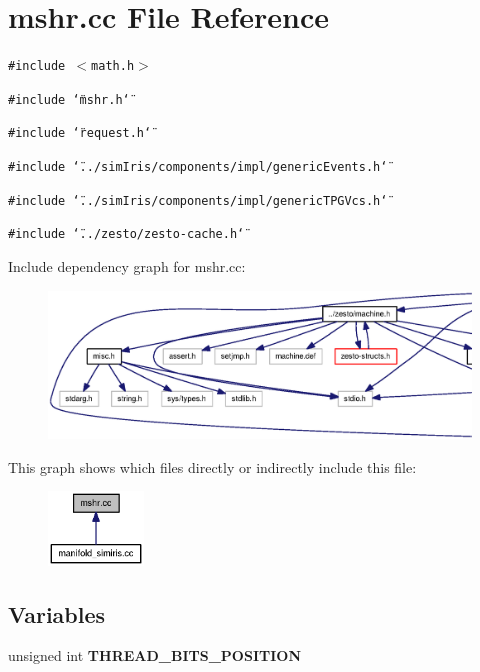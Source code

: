 \section{mshr.cc File Reference}
\label{mshr_8cc}
{\tt \#include $<$math.h$>$}\par
{\tt \#include \char`\"{}mshr.h\char`\"{}}\par
{\tt \#include \char`\"{}request.h\char`\"{}}\par
{\tt \#include \char`\"{}../simIris/components/impl/genericEvents.h\char`\"{}}\par
{\tt \#include \char`\"{}../simIris/components/impl/genericTPGVcs.h\char`\"{}}\par
{\tt \#include \char`\"{}../zesto/zesto-cache.h\char`\"{}}\par


Include dependency graph for mshr.cc:\nopagebreak
\begin{figure}[H]
\begin{center}
\leavevmode
\includegraphics[width=420pt]{mshr_8cc__incl}
\end{center}
\end{figure}


This graph shows which files directly or indirectly include this file:\nopagebreak
\begin{figure}[H]
\begin{center}
\leavevmode
\includegraphics[width=72pt]{mshr_8cc__dep__incl}
\end{center}
\end{figure}
\subsection*{Variables}
\begin{CompactItemize}
\item 
unsigned int {\bf THREAD\_\-BITS\_\-POSITION}
\end{CompactItemize}



